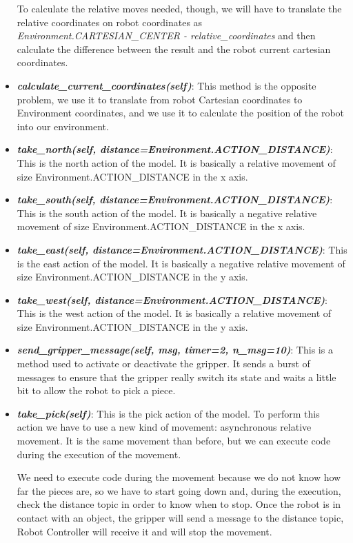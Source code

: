 \begin{itemize}
	 			To calculate the relative moves needed, though, we will have to translate the relative coordinates on robot coordinates as \textit{Environment.CARTESIAN\_CENTER - relative\_coordinates} and then calculate the difference between the result and the robot current cartesian coordinates.
	 			\item[\textendash]\textbf{\textit{calculate\_current\_coordinates(self)}}: This method is the opposite problem, we use it to translate from robot Cartesian coordinates to Environment coordinates, and we use it to calculate the position of the robot into our environment.
	 			\item[\textendash]\textbf{\textit{take\_north(self, distance=Environment.ACTION\_DISTANCE)}}: This is the north action of the model. It is basically a relative movement of size Environment.ACTION\_DISTANCE in the x axis.
	 			\item[\textendash]\textbf{\textit{take\_south(self, distance=Environment.ACTION\_DISTANCE)}}: This is the south action of the model. It is basically a negative relative movement of size Environment.ACTION\_DISTANCE in the x axis.
	 			\item[\textendash]\textbf{\textit{take\_east(self, distance=Environment.ACTION\_DISTANCE)}}: This is the east action of the model. It is basically a negative relative movement of size Environment.ACTION\_DISTANCE in the y axis.
	 			\item[\textendash]\textbf{\textit{take\_west(self, distance=Environment.ACTION\_DISTANCE)}}: This is the west action of the model. It is basically a relative movement of size Environment.ACTION\_DISTANCE in the y axis.
	 			\item[\textendash]\textbf{\textit{send\_gripper\_message(self, msg, timer=2, n\_msg=10)}}: This is a method used to activate or deactivate the gripper. It sends a burst of messages to ensure that the gripper really switch its state and waits a little bit to allow the robot to pick a piece.
	 			\item[\textendash]\textbf{\textit{take\_pick(self)}}: This is the pick action of the model. To perform this action we have to use a new kind of movement: asynchronous relative movement. It is the same movement than before, but we can execute code during the execution of the movement.
	 			
	 			We need to execute code during the movement because we do not know how far the pieces are, so we have to start going down and, during the execution, check the distance topic in order to know when to stop. Once the robot is in contact with an object, the gripper will send a message to the distance topic, Robot Controller will receive it and will stop the movement. 
	 			

\end{itemize}
